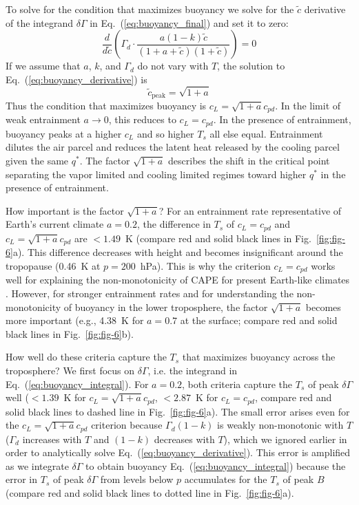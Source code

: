\documentclass[draft]{ametsocV6.1}
\begin{document}
To solve for the condition that maximizes buoyancy we solve for the $\tilde{c}$ derivative of the integrand $\delta \Gamma$ in Eq.~(\ref{eq:buoyancy_final}) and set it to zero:
\begin{equation}
    \frac{d}{d \tilde{c}}\left(\Gamma_d \cdot \frac{a(1-k)\tilde{c}}{(1+a+\tilde{c})(1+\tilde{c})}\right) = 0 \label{eq:buoyancy_derivative}
\end{equation}
If we assume that $a$, $k$, and $\Gamma_d$ do not vary with $T$, the solution to Eq.~(\ref{eq:buoyancy_derivative}) is
\begin{equation}
    \tilde{c}_\text{peak}=\sqrt{1+a} \label{eq:buoyancy_quadratic}
\end{equation}
Thus the condition that maximizes buoyancy is $c_L = \sqrt{1+a} c_{pd}$. In the limit of weak entrainment $a \to 0$, this reduces to $c_L = c_{pd}$. In the presence of entrainment, buoyancy peaks at a higher $c_L$ and so higher $T_s$ all else equal. Entrainment dilutes the air parcel and reduces the latent heat released by the cooling parcel given the same $q^*$. The factor $\sqrt{1+a}$ describes the shift in the critical point separating the vapor limited and cooling limited regimes toward higher $q^*$ in the presence of entrainment.

How important is the factor $\sqrt{1+a}$? For an entrainment rate representative of Earth's current climate $a=0.2$, the difference in $T_s$ of $c_L=c_{pd}$ and $c_L=\sqrt{1+a}c_{pd}$ are $< 1.49$~K (compare red and solid black lines in Fig.~\ref{fig:fig-6}a). This difference decreases with height and becomes insignificant around the tropopause (0.46~K at $p=200$~hPa). This is why the criterion $c_L = c_{pd}$ works well for explaining the non-monotonicity of CAPE for present Earth-like climates \citep{romps2016}. However, for stronger entrainment rates and for understanding the non-monotonicity of buoyancy in the lower troposphere, the factor $\sqrt{1+a}$ becomes more important (e.g., 4.38~K for $a=0.7$ at the surface; compare red and solid black lines in Fig.~\ref{fig:fig-6}b).

How well do these criteria capture the $T_s$ that maximizes buoyancy across the troposphere? We first focus on $\delta \Gamma$, i.e. the integrand in Eq.~(\ref{eq:buoyancy_integral}). For $a=0.2$, both criteria capture the $T_s$ of peak $\delta \Gamma$ well ($<1.39$~K for $c_L=\sqrt{1+a}c_{pd}$, $< 2.87$~K for $c_L=c_{pd}$, compare red and solid black lines to dashed line in Fig.~\ref{fig:fig-6}a). The small error arises even for the $c_L=\sqrt{1+a}c_{pd}$ criterion because $\Gamma_d(1-k)$ is weakly non-monotonic with $T$ ($\Gamma_d$ increases with $T$ and $(1-k)$ decreases with $T$), which we ignored earlier in order to analytically solve Eq.~(\ref{eq:buoyancy_derivative}). This error is amplified as we integrate $\delta \Gamma$ to obtain buoyancy Eq.~(\ref{eq:buoyancy_integral}) because the error in $T_s$ of peak $\delta \Gamma$ from levels below $p$ accumulates for the $T_s$ of peak $B$ (compare red and solid black lines to dotted line in Fig.~\ref{fig:fig-6}a).
\end{document}
